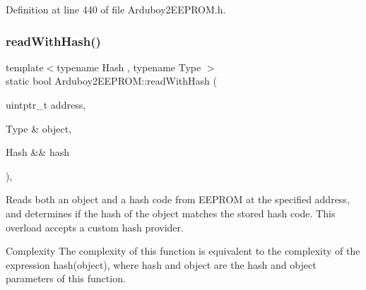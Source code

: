 Definition at line 440 of file Arduboy2\+E\+E\+P\+R\+O\+M.\+h.

\mbox{\label{classArduboy2EEPROM_a6b0ef10b0c2f082b2c55a6e002802512}} 
\subsubsection{\texorpdfstring{readWithHash()}{readWithHash()}\hspace{0.1cm}{\footnotesize\ttfamily [2/2]}}
{\footnotesize\ttfamily template$<$typename Hash , typename Type $>$ \\
static bool Arduboy2\+E\+E\+P\+R\+O\+M\+::read\+With\+Hash (\begin{DoxyParamCaption}\item[{uintptr\+\_\+t}]{address,  }\item[{Type \&}]{object,  }\item[{Hash \&\&}]{hash }\end{DoxyParamCaption})\hspace{0.3cm}{\ttfamily [inline]}, {\ttfamily [static]}}



Reads both an object and a hash code from E\+E\+P\+R\+OM at the specified address, and determines if the hash of the object matches the stored hash code. This overload accepts a custom hash provider. 

\begin{DoxyParagraph}{Complexity}
The complexity of this function is equivalent to the complexity of the expression {\ttfamily hash(object)}, where {\ttfamily hash} and {\ttfamily object} are the {\ttfamily hash} and {\ttfamily object} parameters of this function.
\end{DoxyParagraph}

